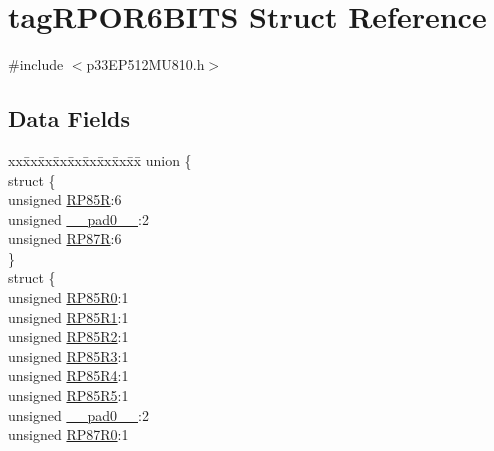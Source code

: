 \hypertarget{structtag_r_p_o_r6_b_i_t_s}{}\section{tag\+R\+P\+O\+R6\+B\+I\+TS Struct Reference}
\label{structtag_r_p_o_r6_b_i_t_s}


{\ttfamily \#include $<$p33\+E\+P512\+M\+U810.\+h$>$}

\subsection*{Data Fields}
\begin{DoxyCompactItemize}
\item 
\begin{tabbing}
xx\=xx\=xx\=xx\=xx\=xx\=xx\=xx\=xx\=\kill
union \{\\
\>struct \{\\
\>\>unsigned \hyperlink{structtag_r_p_o_r6_b_i_t_s_a07db40abceea1178294b0485c89cf6a9}{RP85R}:6\\
\>\>unsigned \hyperlink{structtag_r_p_o_r6_b_i_t_s_adf71f3d8410c1f1dbbc96680a92c49af}{\_\_pad0\_\_}:2\\
\>\>unsigned \hyperlink{structtag_r_p_o_r6_b_i_t_s_a08e52b410f3be7484bc0935626afd26e}{RP87R}:6\\
\>\} \\
\>struct \{\\
\>\>unsigned \hyperlink{structtag_r_p_o_r6_b_i_t_s_adf0b63edfa19371ac86e2ed8fa81e2b2}{RP85R0}:1\\
\>\>unsigned \hyperlink{structtag_r_p_o_r6_b_i_t_s_a83009ac9eeb06492dee07def123ae36b}{RP85R1}:1\\
\>\>unsigned \hyperlink{structtag_r_p_o_r6_b_i_t_s_a88744e3753a6bb5ca7175490f7aa20f2}{RP85R2}:1\\
\>\>unsigned \hyperlink{structtag_r_p_o_r6_b_i_t_s_a79253f49384008f46b2b62d90aefa32b}{RP85R3}:1\\
\>\>unsigned \hyperlink{structtag_r_p_o_r6_b_i_t_s_af201bf3e101e5026bf6ba25e3af43487}{RP85R4}:1\\
\>\>unsigned \hyperlink{structtag_r_p_o_r6_b_i_t_s_a37b829c03d65134c8224a0dad92d1e31}{RP85R5}:1\\
\>\>unsigned \hyperlink{structtag_r_p_o_r6_b_i_t_s_adf71f3d8410c1f1dbbc96680a92c49af}{\_\_pad0\_\_}:2\\
\>\>unsigned \hyperlink{structtag_r_p_o_r6_b_i_t_s_a497e96033a6836decd0bdd77c3b2d36f}{RP87R0}:1\\

\end{tabbing}
\end{DoxyCompactItemize}
